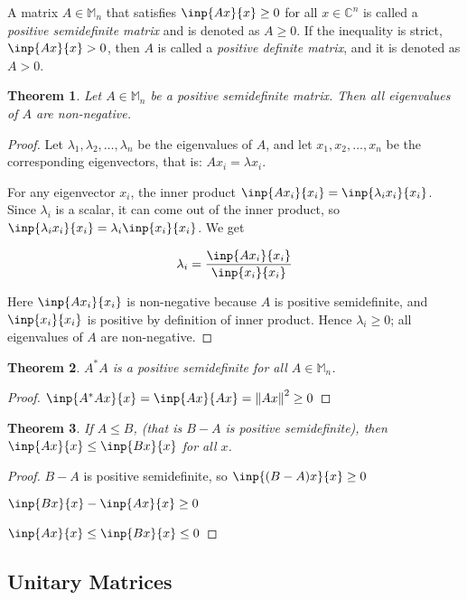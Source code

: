 \documentclass[twofold]{article}
\newcommand*\adj[1]{#1^*}
\newcommand*\norm[1]{\left \Vert #1 \right\Vert}
\theoremstyle{plain}
\newtheorem{theorem}{Theorem}
\theoremstyle{definition}
\theoremstyle{remark}
\begin{document}
A matrix \(A\in \mathbb{M}_n\) that satisfies \(\inp{Ax}{x} \ge 0\) for all \(x \in \mathbb{C}^n\) is called a {\em positive semidefinite matrix} and is denoted as \(A \ge 0\). If the inequality is strict, \(\inp{Ax}{x} > 0\), then \(A\) is called a {\em positive definite matrix}, and it is denoted as \(A > 0\). 

\begin{theorem} Let \(A \in \mathbb{M}_n\) be a positive semidefinite matrix. Then all eigenvalues of \(A\) are non-negative. \end{theorem}
\begin{proof} Let \(\lambda_1, \lambda_2, \ldots , \lambda_n\) be the eigenvalues of \(A\), and let \(x_1, x_2, \ldots , x_n\) be the corresponding eigenvectors, that is: \(Ax_i = \lambda x_i\). 

 For any eigenvector \(x_i\), the inner product \(\inp{Ax_i}{x_i} = \inp{\lambda_i x_i}{x_i}\). Since \(\lambda_i\) is a scalar, it can come out of the inner product, so  \( \inp{\lambda_i x_i}{x_i}  = \lambda_i \inp{x_i}{x_i}\). We get

\[\lambda_i = \frac{\inp{Ax_i}{x_i}}{\inp{x_i}{x_i}}\]

Here \(\inp{Ax_i}{x_i} \) is non-negative because \(A\) is positive semidefinite, and \(\inp{x_i}{x_i}\) is positive by definition of inner product. Hence \(\lambda_i \ge 0\); all eigenvalues of \(A\) are non-negative. \end{proof}


\begin{theorem} \(\adj{A} A\) is a positive semidefinite for all \(A \in \mathbb{M}_n\). \end{theorem}
\begin{proof} \(\inp{\adj{A} A x}{ x} = \inp{Ax}{Ax} = \norm{Ax}^2 \ge 0\)\end{proof}

\begin{theorem} If \(A \le B\), (that is \(B - A\) is positive semidefinite), then \(\inp{Ax}{x} \le \inp{Bx}{x}\) for all \(x\). \end{theorem}
\begin{proof} \(B - A\) is positive semidefinite, so \(\inp{(B - A) x}{x} \ge 0\)

\(\inp{Bx}{x} - \inp{Ax}{x} \ge 0\)

\(\inp{Ax}{x} \le \inp{Bx}{x} \le 0\) \end{proof}


\subsection{Unitary Matrices}
\end{document}
